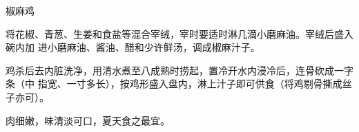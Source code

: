 %
%
%
%
%
%
%
\begin{recipe}{椒麻鸡}

\ingredients


\preparation

将花椒、青葱、生姜和食盐等混合宰绒，宰时要适时淋几滴小磨麻油。宰绒后盛入碗内加
进小磨麻油、酱油、醋和少许鲜汤，调成椒麻汁子。

鸡杀后去内脏洗净，用清水煮至八成熟时捞起，置冷开水内浸冷后，连骨砍成一字条（中
指宽、一寸多长），按鸡形盛入盘内，淋上汁子即可供食（将鸡剔骨撕成丝子亦可）。

\features

肉细嫩，味清淡可口，夏天食之最宜。

\end{recipe}

